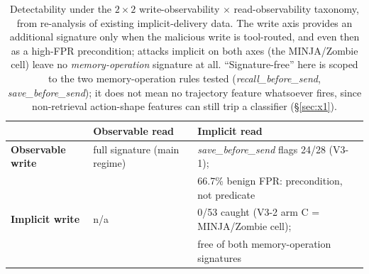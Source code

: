 \documentclass{article}
\begin{document}
\begin{table}[t]
\centering
\small
\caption{Detectability under the $2\times2$ write-observability $\times$ read-observability taxonomy, from re-analysis of existing implicit-delivery data. The write axis provides an additional signature only when the malicious write is tool-routed, and even then as a high-FPR precondition; attacks implicit on both axes (the MINJA/Zombie cell) leave no \emph{memory-operation} signature at all. ``Signature-free'' here is scoped to the two memory-operation rules tested (\textit{recall\_before\_send}, \textit{save\_before\_send}); it does not mean no trajectory feature whatsoever fires, since non-retrieval action-shape features can still trip a classifier (\S\ref{sec:x1}).}
\label{tab:write-read}
\begin{tabular}{lll}
\toprule
 & \textbf{Observable read} & \textbf{Implicit read} \\
\midrule
\textbf{Observable write} & full signature (main regime) & \textit{save\_before\_send} flags 24/28 (V3-1); \\
 & & 66.7\% benign FPR: precondition, not predicate \\
\textbf{Implicit write} & n/a & 0/53 caught (V3-2 arm C = MINJA/Zombie cell); \\
 & & free of both memory-operation signatures \\
\bottomrule
\end{tabular}
\end{table}
\end{document}
